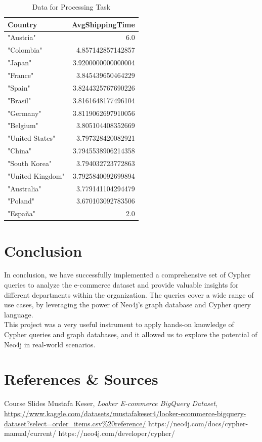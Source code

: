 \documentclass[a4paper,12pt]{article}
\begin{document}
\begin{table}[h!]
  \centering
  \caption{Data for Processing Task}
  \label{tab:processing_data}
  \begin{tabular}{l r}
      \toprule
      \textbf{Country} & \textbf{AvgShippingTime} \\
      \midrule
      "Austria" &	6.0\\
      "Colombia" & 4.857142857142857 \\
      "Japan" & 3.9200000000000004 \\
      "France" & 3.845439650464229 \\
      "Spain" & 3.8244325767690226 \\
      "Brasil" & 3.8161648177496104 \\
      "Germany" & 3.8119062697910056 \\
      "Belgium" & 3.805104408352669 \\
      "United States" & 3.797328420082921 \\
      "China" & 3.7945538906214358 \\
      "South Korea" & 3.794032723772863 \\
      "United Kingdom" & 3.7925840092699894 \\
      "Australia" & 3.779141104294479 \\
      "Poland" & 3.670103092783506 \\
      "España" & 2.0 \\
      \bottomrule
  \end{tabular}
\end{table}

\section{Conclusion}
In conclusion, we have successfully implemented a comprehensive set of Cypher queries to analyze the e-commerce dataset and provide valuable insights for different departments within the organization. The queries cover a wide range of use cases, by leveraging the power of Neo4j's graph database and Cypher query language. 
\\
This project was a very useful instrument to apply hands-on knowledge of Cypher queries and graph databases, and it allowed us to explore the potential of Neo4j in real-world scenarios. 


\newpage
\section{References \& Sources}
  \begin{thebibliography}{9}
    \bibitem{} Course Slides
     Mustafa Keser, \emph{Looker E-commerce BigQuery Dataset}, \url{https://www.kaggle.com/datasets/mustafakeser4/looker-ecommerce-bigquery-dataset?select=order_items.csv%20reference/}
    \bibitem{} https://neo4j.com/docs/cypher-manual/current/
    \bibitem{} https://neo4j.com/developer/cypher/
  \end{thebibliography}
\end{document}
